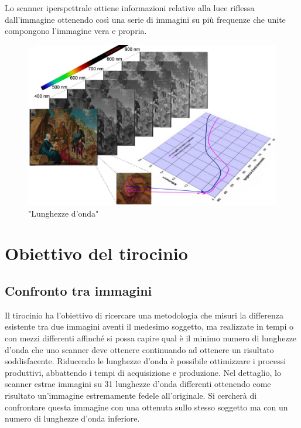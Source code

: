 \documentclass[a4paper,11pt]{article}
\begin{document}
        Lo scanner iperspettrale ottiene informazioni relative alla luce riflessa dall'immagine ottenendo così una serie di immagini su più frequenze che unite compongono l'immagine vera e propria.
    
    \newpage
    
        \begin{figure}[h]
            \centering
            \includegraphics[scale=0.4]{colorimetria4}
            \caption{"Lunghezze d'onda"}
        \end{figure}

    \newpage
    \section {Obiettivo del tirocinio}
    \subsection{Confronto tra immagini}
    Il tirocinio ha l’obiettivo di ricercare una metodologia che misuri la differenza esistente tra due immagini aventi il medesimo soggetto, ma realizzate in tempi o con mezzi differenti affinché si possa 
    capire qual è il minimo numero di lunghezze d'onda che uno scanner deve ottenere continuando ad ottenere un risultato soddisfacente.
    Riducendo le lunghezze d'onda è possibile ottimizzare i processi produttivi, abbattendo i tempi di acquisizione e produzione.
    Nel dettaglio, lo scanner estrae immagini su 31 lunghezze d'onda differenti ottenendo come risultato un'immagine estremamente fedele all'originale. Si cercherà di confrontare questa immagine con una ottenuta sullo stesso soggetto ma con un numero di lunghezze d'onda inferiore. 
    
\end{document}
